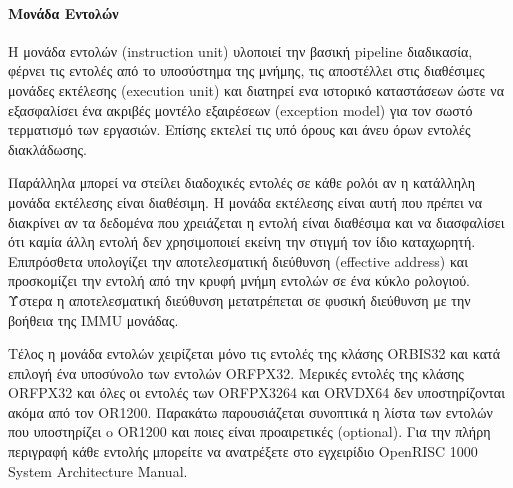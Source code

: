 \documentclass[a4paper,10pt]{article}
\numberwithin{figure}{section}
\numberwithin{table}{section}
\begin{document}
\vspace{0.7cm}

\paragraph{Μονάδα Εντολών\newline\newline}

Η μονάδα εντολών (instruction unit) υλοποιεί την βασική pipeline διαδικασία, φέρνει τις
εντολές από το υποσύστημα της μνήμης, τις αποστέλλει στις διαθέσιμες μονάδες εκτέλεσης (execution unit)
και διατηρεί ενα ιστορικό καταστάσεων ώστε να εξασφαλίσει ένα ακριβές μοντέλο εξαιρέσεων (exception model)
για τον σωστό τερματισμό των εργασιών. Επίσης εκτελεί τις υπό όρους και άνευ όρων εντολές διακλάδωσης.
\newline

Παράλληλα μπορεί να στείλει διαδοχικές εντολές σε κάθε ρολόι αν η κατάλληλη μονάδα εκτέλεσης
είναι διαθέσιμη. Η μονάδα εκτέλεσης είναι αυτή που πρέπει να διακρίνει αν τα δεδομένα που χρειάζεται
η εντολή είναι διαθέσιμα και να διασφαλίσει ότι καμία άλλη εντολή δεν χρησιμοποιεί εκείνη την
στιγμή τον ίδιο καταχωρητή. Επιπρόσθετα υπολογίζει την αποτελεσματική διεύθυνση (effective address)
και προσκομίζει την εντολή από την κρυφή μνήμη εντολών σε ένα κύκλο ρολογιού.  Ύστερα η
αποτελεσματική διεύθυνση μετατρέπεται σε φυσική διεύθυνση με την βοήθεια της IMMU μονάδας. 
\newline

Τέλος η μονάδα εντολών χειρίζεται μόνο τις εντολές της κλάσης ORBIS32 και κατά επιλογή ένα
υποσύνολο των εντολών ORFPX32. Μερικές εντολές της κλάσης ORFPX32  και όλες οι εντολές
των ORFPX3264 και ORVDX64 δεν υποστηρίζονται ακόμα από τον OR1200. Παρακάτω παρουσιάζεται 
συνοπτικά η λίστα των εντολών που υποστηρίζει o OR1200 και ποιες είναι προαιρετικές (optional).  
Για την πλήρη περιγραφή κάθε εντολής μπορείτε να ανατρέξετε στο εγχειρίδιο 
OpenRISC 1000 System Architecture Manual.
\end{document}
